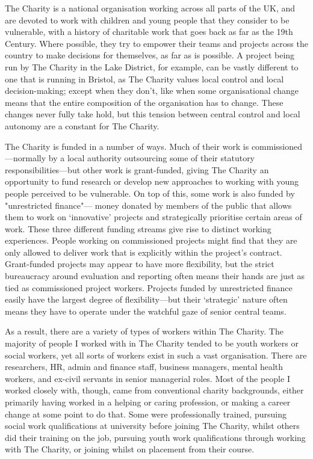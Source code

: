 The Charity is a national organisation working across all parts of the UK, and are devoted to work with children and young people that they consider to be vulnerable, with a history of charitable work that goes back as far as the 19th Century. Where possible, they try to empower their teams and projects across the country to make decisions for themselves, as far as is possible. A project being run by The Charity in the Lake District, for example, can be vastly different to one that is running in Bristol, as The Charity values local control and local decision-making; except when they don’t, like when some organisational change means that the entire composition of the organisation has to change. These changes never fully take hold, but this tension between central control and local autonomy are a constant for The Charity.

The Charity is funded in a number of ways. Much of their work is commissioned—normally by a local authority outsourcing some of their statutory responsibilities—but other work is grant-funded, giving The Charity an opportunity to fund research or develop new approaches to working with young people perceived to be vulnerable. On top of this, some work is also funded by "unrestricted finance"— money donated by members of the public that allows them to work on `innovative' projects and strategically prioritise certain areas of work. These three different funding streams give rise to distinct working experiences. People working on commissioned projects might find that they are only allowed to deliver work that is explicitly within the project's contract. Grant-funded projects may appear to have more flexibility, but the strict bureaucracy around evaluation and reporting often means their hands are just as tied as commissioned project workers. Projects funded by unrestricted finance easily have the largest degree of flexibility—but their `strategic' nature often means they have to operate under the watchful gaze of senior central teams. 

As a result, there are a variety of types of workers within The Charity. The majority of people I worked with in The Charity tended to be youth workers or social workers, yet all sorts of workers exist in such a vast organisation. There are researchers, HR, admin and finance staff, business managers, mental health workers, and ex-civil servants in senior managerial roles. Most of the people I worked closely with, though, came from conventional charity backgrounds, either primarily having worked in a helping or caring profession, or making a career change at some point to do that. Some were professionally trained, pursuing social work qualifications at university before joining The Charity, whilst others did their training on the job, pursuing youth work qualifications through working with The Charity, or joining whilst on placement from their course. 

